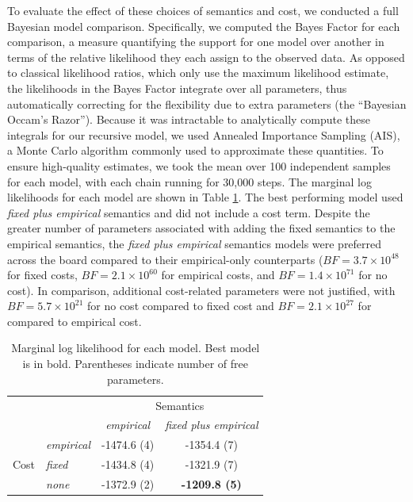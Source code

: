 \documentclass[11pt]{article}
\newcommand{\tableref}[1]{Table \ref{#1}}
\begin{document}
To evaluate the effect of these choices of semantics and cost, we conducted a full Bayesian model comparison.
Specifically, we computed the Bayes Factor for each comparison, a measure quantifying the support for one model over another in terms of the relative likelihood they each assign to the observed data.
As opposed to classical likelihood ratios, which only use the maximum likelihood estimate, the likelihoods in the Bayes Factor integrate over all parameters, thus automatically correcting for the flexibility due to extra parameters (the ``Bayesian Occam's Razor''). 
Because it was intractable to analytically compute these integrals for our recursive model, we used Annealed Importance Sampling (AIS), a Monte Carlo algorithm commonly used to approximate these quantities.
To ensure high-quality estimates, we took the mean over 100 independent samples for each model, with each chain running for 30,000 steps.
The marginal log likelihoods for each model are shown in \tableref{tab:exp2-modelcomparison}. 
The best performing model used \emph{fixed plus empirical} semantics and did not include a cost term. 
Despite the greater number of parameters associated with adding the fixed semantics to the empirical semantics, the \emph{fixed plus empirical} semantics models were preferred across the board compared to their empirical-only counterparts ($BF = 3.7 \times 10^{48}$ for fixed costs, $BF = 2.1 \times 10^{60}$ for empirical costs, and $BF = 1.4 \times 10^{71}$ for no cost). 
In comparison, additional cost-related parameters were not justified, with $BF = 5.7 \times 10^{21}$ for no cost compared to fixed cost and $BF = 2.1 \times 10^{27}$ for compared to empirical cost.

\begin{table}
\caption{Marginal log likelihood for each model. Best model is in bold. Parentheses indicate number of free parameters.}
\centering
\begin{tabular}{l l c c }
\toprule
& & \multicolumn{2}{c}{Semantics}\\
& & \emph{empirical} & \emph{fixed plus empirical}\\
\midrule
\multirow{3}{*}{Cost} & \emph{empirical} & -1474.6 (4) & -1354.4 (7) \\
 & \emph{fixed} & -1434.8 (4) & -1321.9 (7) \\
 & \emph{none} & -1372.9 (2) & \textbf{-1209.8 (5)} \\ 
\bottomrule
\end{tabular}
\label{tab:exp2-modelcomparison}
\end{table}
\end{document}
